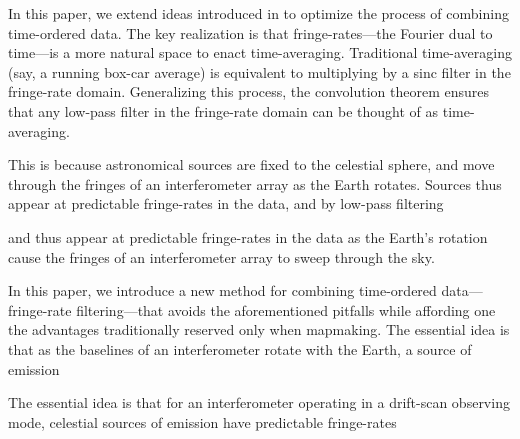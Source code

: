 \documentclass[twocolumn,apj,numberedappendix]{emulateapj}
\begin{document}
In this paper, we extend ideas introduced in \citet{parsons_backer2009} to optimize the process of combining time-ordered data. The key realization is that fringe-rates---the Fourier dual to time---is a
more natural space to enact time-averaging. Traditional time-averaging (say, a running box-car average)
is equivalent to multiplying by a sinc filter in the fringe-rate domain. Generalizing this process, the
convolution theorem ensures that any low-pass filter in the fringe-rate domain can be thought of as
time-averaging. 


This is because astronomical sources are fixed to the
celestial sphere, and move through the fringes of an interferometer array as the Earth rotates. Sources
thus appear at predictable fringe-rates in the data, and by low-pass filtering 

and thus appear at predictable fringe-rates in the data as the Earth's rotation cause the fringes
of an interferometer array to sweep through the sky. 


In this paper, we introduce a new method for combining time-ordered data---fringe-rate filtering---that avoids the aforementioned pitfalls while affording one the advantages traditionally reserved only when mapmaking.  The essential idea is that as the baselines of an interferometer rotate with the Earth, a source of emission 

The essential idea is that for an interferometer operating in a drift-scan observing mode, celestial sources of emission have predictable fringe-rates 
\end{document}
